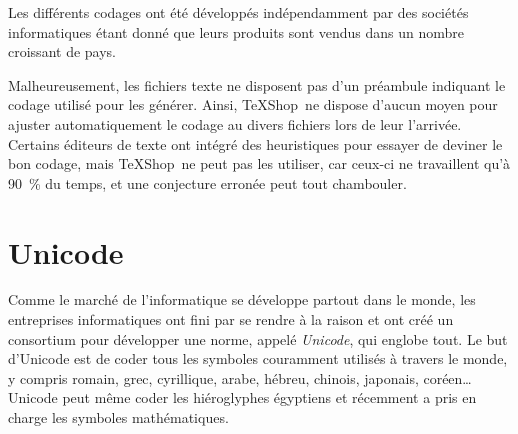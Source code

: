 \documentclass[11pt,french]{article}
\newcommand{\TS}{\textsf{\TeX Shop}}
\begin{document}
Les différents codages ont été développés indépendamment par des sociétés informatiques étant donné que leurs produits sont vendus dans un nombre croissant de pays. 

Malheureusement, les fichiers texte ne disposent pas d'un préambule indiquant le codage utilisé pour les générer. Ainsi, \TS\ ne dispose d'aucun moyen pour ajuster automatiquement le codage au divers fichiers lors de leur l'arrivée. Certains éditeurs de texte ont intégré des heuristiques pour essayer de deviner le bon codage, mais \TS\ ne peut pas les utiliser, car ceux-ci ne travaillent qu'à \SI{90}{\%} du temps, et une conjecture erronée peut tout chambouler.

\section{Unicode}

Comme le marché de l'informatique se développe partout dans le monde, les entreprises informatiques ont fini par se rendre à la raison et ont créé un consortium pour développer une norme, appelé {\em Unicode}, qui englobe tout. Le but d'Unicode est de coder tous les symboles couramment utilisés à travers le monde, y compris romain, grec, cyrillique, arabe, hébreu, chinois, japonais, coréen… Unicode peut même coder les hiéroglyphes égyptiens et récemment a pris en charge les symboles mathématiques.
\end{document}

